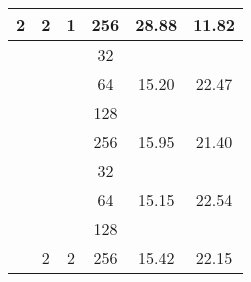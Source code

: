 \begin{longtable}{cccccc}
\multirow{-8}{*}{2}   & \multirow{-4}{*}{{  2}}                         & \multirow{-4}{*}{{  1}}                         & 256                                             & {  28.88}                            & {  11.82}                            \\ \hline
                      & \cellcolor[HTML]{EFEFEF}{  }                    & \cellcolor[HTML]{EFEFEF}{  }                    & \cellcolor[HTML]{EFEFEF}32                      & \cellcolor[HTML]{EFEFEF}{  17.21}    & \cellcolor[HTML]{EFEFEF}{  19.84}    \\
                      & \cellcolor[HTML]{EFEFEF}{  }                    & \cellcolor[HTML]{EFEFEF}{  }                    & 64                                              & {  15.20}                            & {  22.47}                            \\
                      & \cellcolor[HTML]{EFEFEF}{  }                    & \cellcolor[HTML]{EFEFEF}{  }                    & \cellcolor[HTML]{EFEFEF}128                     & \cellcolor[HTML]{EFEFEF}{  15.07}    & \cellcolor[HTML]{EFEFEF}{  22.66}    \\
                      & \multirow{-4}{*}{\cellcolor[HTML]{EFEFEF}{  1}} & \multirow{-4}{*}{\cellcolor[HTML]{EFEFEF}{  4}} & 256                                             & {  15.95}                            & {  21.40}                            \\ \cline{2-6}
                      & {  }                                            & {  }                                            & \cellcolor[HTML]{EFEFEF}32                      & \cellcolor[HTML]{EFEFEF}{  17.29}    & \cellcolor[HTML]{EFEFEF}{  19.74}    \\
                      & {  }                                            & {  }                                            & 64                                              & {  15.15}                            & {  22.54}                            \\
                      & {  }                                            & {  }                                            & \cellcolor[HTML]{EFEFEF}128                     & \cellcolor[HTML]{EFEFEF}{  14.80}    & \cellcolor[HTML]{EFEFEF}{  23.06}    \\
                      & \multirow{-4}{*}{{  2}}                         & \multirow{-4}{*}{{  2}}                         & 256                                             & {  15.42}                            & {  22.15}                            \\ \cline{2-6}

\end{longtable}
